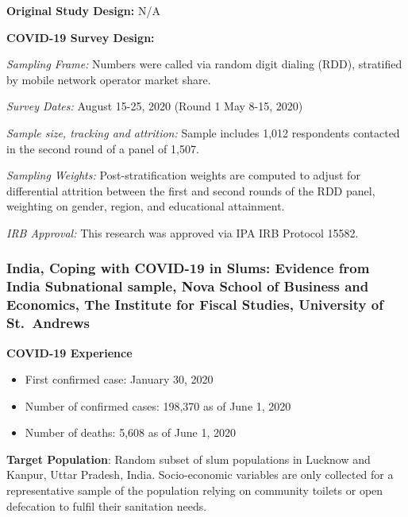 \documentclass[
  12pt,
]{article}
\begin{document}
\textbf{Original Study Design:} N/A

\textbf{COVID-19 Survey Design:}

\emph{Sampling Frame:} Numbers were called via random digit dialing (RDD), stratified by mobile network operator market share.

\emph{Survey Dates:} August 15-25, 2020 (Round 1 May 8-15, 2020)

\emph{Sample size, tracking and attrition:} Sample includes 1,012 respondents contacted in the second round of a panel of 1,507.

\emph{Sampling Weights:} Post-stratification weights are computed to adjust for differential attrition between the first and second rounds of the RDD panel, weighting on gender, region, and educational attainment.

\emph{IRB Approval:} This research was approved via IPA IRB Protocol 15582.

\hypertarget{india-coping-with-covid-19-in-slums-evidence-from-india-subnational-sample-nova-school-of-business-and-economics-the-institute-for-fiscal-studies-university-of-st.-andrews}{%
\subsubsection*{India, Coping with COVID-19 in Slums: Evidence from India Subnational sample, Nova School of Business and Economics, The Institute for Fiscal Studies, University of St.~Andrews}\label{india-coping-with-covid-19-in-slums-evidence-from-india-subnational-sample-nova-school-of-business-and-economics-the-institute-for-fiscal-studies-university-of-st.-andrews}}

\textbf{COVID-19 Experience}

\begin{itemize}
\item First confirmed case: January 30, 2020
\item Number of confirmed cases: 198,370 as of June 1, 2020 
\item Number of deaths: 5,608 as of June 1, 2020 
\end{itemize}

\textbf{Target Population}: Random subset of slum populations in Lucknow and Kanpur, Uttar Pradesh, India. Socio-economic variables are only collected for a representative sample of the population relying on community toilets or open defecation to fulfil their sanitation needs.
\end{document}

